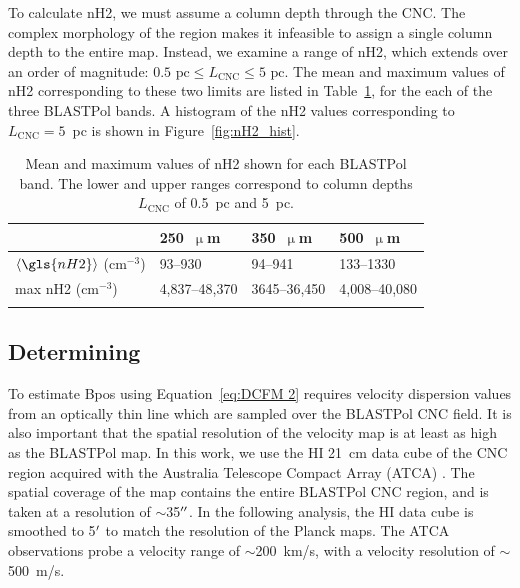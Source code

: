 To calculate \gls{nH2}, we must assume a column depth through the CNC\@. The complex morphology of the region makes it infeasible to assign a single column depth to the entire map. Instead, we examine a range of \gls{nH2}, which extends over an order of magnitude: $0.5 \text{~pc} \leq L_{\mathrm{CNC}} \leq 5 \text{~pc}$. The mean and maximum values of \gls{nH2} corresponding to these two limits are listed in Table~\ref{table:nH2}, for the each of the three BLASTPol bands. A histogram of the \gls{nH2} values corresponding to $L_{\mathrm{CNC}} = 5$~pc is shown in Figure~\ref{fig:nH2_hist}.

\begin{table}[hbtp]
  \centering
\begin{tabular}{@{}llll@{}}
\dtoprule{}
                            & 250~$\upmu$m     & 350~$\upmu$m     & 500~$\upmu$m     \\ \midrule
$\langle \gls{nH2} \rangle$ ($\mathrm{cm}^{-3}$) & 93--930      & 94--941      & 133--1330    \\
max \gls{nH2} ($\mathrm{cm}^{-3}$)             & 4,837--48,370 & 3645--36,450 & 4,008--40,080
\\ \dbottomrule{}
\\
\end{tabular}
\centering
\caption[Mean and maximum values of  shown for each BLASTPol band.]{Mean and maximum values of \gls{nH2} shown for each BLASTPol band. The lower and upper ranges correspond to column depths $L_{\mathrm{CNC}}$ of 0.5~pc and 5~pc.}
\label{table:nH2}
\end{table}

\subsection{Determining }\label{sigV}

To estimate \gls{Bpos} using Equation~\ref{eq:DCFM 2} requires velocity dispersion values from an optically thin line which are sampled over the BLASTPol CNC field. It is also important that the spatial resolution of the velocity map is at least as high as the BLASTPol map. In this work, we use the $\mathrm{HI}$ 21~cm data cube of the CNC region acquired with the Australia Telescope Compact Array (ATCA) \citep{rebolledo2017carina}. The spatial coverage of the map contains the entire BLASTPol CNC region, and is taken at a resolution of $\sim$35$\operatorname{^{\prime\prime}}$. In the following analysis, the $\mathrm{HI}$ data cube is smoothed to 5$\operatorname{^{\prime}}$ to match the resolution of the Planck maps. The ATCA observations probe a velocity range of $\sim$200~km/s, with a velocity resolution of $\sim$500~m/s.

